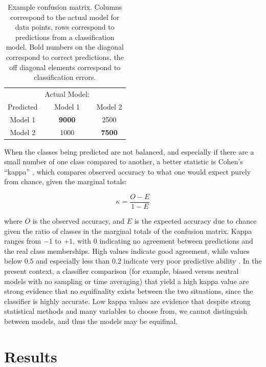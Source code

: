 \begin{table}[ht]
\begin{tabular}{c|cc}
 & Actual Model: & \\
 Predicted &  Model 1 & Model  2 \\
  \hline
 Model  1 & \textbf{9000} & 2500 \\
   Model  2 & 1000 & \textbf{7500} \\
\end{tabular}
    \caption{Example confusion matrix.  Columns correspond to the actual model for data points, rows correspond to predictions from a classification model.  Bold numbers on the diagonal correspond to correct predictions, the off diagonal elements correspond to classification errors.}
    \label{tab:confusion-matrix}
\end{table}


When the classes
being predicted are not balanced, and especially if there are a small
number of one class compared to another, a better statistic is Cohen's
``kappa'' \citep{kuhn2013applied}, which compares observed accuracy to
what one would expect purely from chance, given the marginal totals:

\begin{equation}
\kappa = \frac{O - E}{1 - E}
\label{eq:kappa}
\end{equation}

where \(O\) is the observed accuracy, and \(E\) is the expected accuracy
due to chance given the ratio of classes in the marginal totals of the
confusion matrix. Kappa ranges from \(-1\) to \(+1\), with \(0\)
indicating no agreement between predictions and the real class
memberships. High values indicate good agreement, while values below
\(0.5\) and especially less than \(0.2\) indicate very poor predictive
ability \citep{altman1991practical}. In the present context, a
classifier comparison (for example, biased versus neutral models with no
sampling or time averaging) that yield a high kappa value are strong
evidence that no equifinality exists between the two situations, since
the classifier is highly accurate. Low kappa values are evidence that
despite strong statistical methods and many variables to choose from, we
cannot distinguish between models, and thus the models may be equifinal.  

\section{Results}\label{ctmixtures:sec:results}

